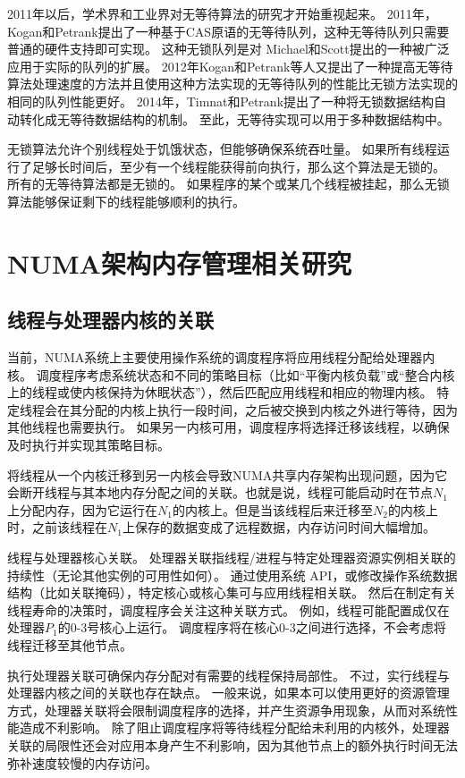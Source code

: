 2011年以后，学术界和工业界对无等待算法的研究才开始重视起来。
2011年，Kogan和Petrank提出了一种基于CAS原语的无等待队列\cite{kogan2011wait}，这种无等待队列只需要普通的硬件支持即可实现。
这种无锁队列是对 Michael和Scott\cite{michael1996simple}提出的一种被广泛应用于实际的队列的扩展。
2012年Kogan和Petrank\cite{kogan2012methodology}等人又提出了一种提高无等待算法处理速度的方法并且使用这种方法实现的无等待队列的性能比无锁方法实现的相同的队列性能更好。
2014年，Timnat和Petrank\cite{timnat2014practical}提出了一种将无锁数据结构自动转化成无等待数据结构的机制。
至此，无等待实现可以用于多种数据结构中。

无锁算法允许个别线程处于饥饿状态，但能够确保系统吞吐量。
如果所有线程运行了足够长时间后，至少有一个线程能获得前向执行，那么这个算法是无锁的。
所有的无等待算法都是无锁的。
如果程序的某个或某几个线程被挂起，那么无锁算法能够保证剩下的线程能够顺利的执行。

\section{NUMA架构内存管理相关研究}

\subsection{线程与处理器内核的关联}
当前，NUMA系统上主要使用操作系统的调度程序将应用线程分配给处理器内核。 调度程序考虑系统状态和不同的策略目标（比如“平衡内核负载”或“整合内核上的线程或使内核保持为休眠状态”），然后匹配应用线程和相应的物理内核。 特定线程会在其分配的内核上执行一段时间，之后被交换到内核之外进行等待，因为其他线程也需要执行。 如果另一内核可用，调度程序将选择迁移该线程，以确保及时执行并实现其策略目标。

将线程从一个内核迁移到另一内核会导致NUMA共享内存架构出现问题，因为它会断开线程与其本地内存分配之间的关联。也就是说，线程可能启动时在节点$N_1$上分配内存，因为它运行在$N_1$的内核上。但是当该线程后来迁移至$N_2$的内核上时，之前该线程在$N_1$上保存的数据变成了远程数据，内存访问时间大幅增加。

线程与处理器核心关联。 
处理器关联指线程/进程与特定处理器资源实例相关联的持续性（无论其他实例的可用性如何）。 
通过使用系统 API，或修改操作系统数据结构（比如关联掩码），特定核心或核心集可与应用线程相关联。 然后在制定有关线程寿命的决策时，调度程序会关注这种关联方式。 
例如，线程可能配置成仅在处理器$P_1$的0-3号核心上运行。 
调度程序将在核心0-3之间进行选择，不会考虑将线程迁移至其他节点。

执行处理器关联可确保内存分配对有需要的线程保持局部性。 
不过，实行线程与处理器内核之间的关联也存在缺点。 一般来说，如果本可以使用更好的资源管理方式，处理器关联将会限制调度程序的选择，并产生资源争用现象，从而对系统性能造成不利影响。 
除了阻止调度程序将等待线程分配给未利用的内核外，处理器关联的局限性还会对应用本身产生不利影响，因为其他节点上的额外执行时间无法弥补速度较慢的内存访问。


